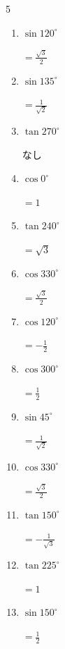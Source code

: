 \begin{multicols}{5}
\begin{enumerate}
  \item $\displaystyle \sin{120^\circ}$

        $\displaystyle =\frac{\sqrt{3}}{2}$

  \item $\displaystyle \sin{135^\circ}$

        $\displaystyle =\frac{1}{\sqrt{2}}$

  \item $\displaystyle \tan{270^\circ}$

        $\displaystyle なし$

  \item $\displaystyle \cos{0^\circ}$

        $\displaystyle =1$

  \item $\displaystyle \tan{240^\circ}$

        $\displaystyle =\sqrt{3}$

\columnbreak %

  \item $\displaystyle \cos{330^\circ}$

        $\displaystyle =\frac{\sqrt{3}}{2}$

  \item $\displaystyle \cos{120^\circ}$

        $\displaystyle =-\frac{1}{2}$

  \item $\displaystyle \cos{300^\circ}$

        $\displaystyle =\frac{1}{2}$

  \item $\displaystyle \sin{45^\circ}$

        $\displaystyle =\frac{1}{\sqrt{2}}$

  \item $\displaystyle \cos{330^\circ}$

        $\displaystyle =\frac{\sqrt{3}}{2}$

  \item $\displaystyle \tan{150^\circ}$

        $\displaystyle =-\frac{1}{\sqrt{3}}$

  \item $\displaystyle \tan{225^\circ}$

        $\displaystyle =1$

  \item $\displaystyle \sin{150^\circ}$

        $\displaystyle =\frac{1}{2}$


\end{enumerate}
\end{multicols}

